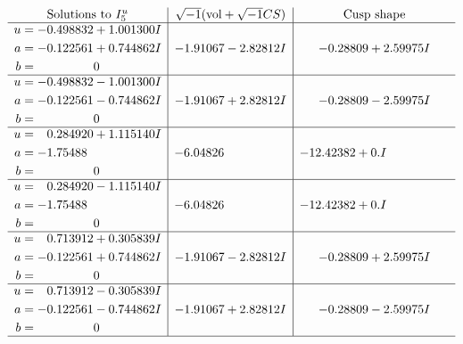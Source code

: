 \documentclass[1p]{elsarticle_modified}
\theoremstyle{definition}
\newcommand{\I}{\sqrt{-1}}
\begin{document}
$$\begin{array}{c|c|c}  
\text{Solutions to }I^u_{5}& \I (\text{vol} + \sqrt{-1}CS) & \text{Cusp shape}\\
 \hline 
\begin{aligned}
u &= -0.498832 + 1.001300 I \\
a &= -0.122561 + 0.744862 I \\
b &= \phantom{-0.000000 } 0\end{aligned}
 & -1.91067 - 2.82812 I & -0.28809 + 2.59975 I \\ \hline\begin{aligned}
u &= -0.498832 - 1.001300 I \\
a &= -0.122561 - 0.744862 I \\
b &= \phantom{-0.000000 } 0\end{aligned}
 & -1.91067 + 2.82812 I & -0.28809 - 2.59975 I \\ \hline\begin{aligned}
u &= \phantom{-}0.284920 + 1.115140 I \\
a &= -1.75488\phantom{ +0.000000I} \\
b &= \phantom{-0.000000 } 0\end{aligned}
 & -6.04826\phantom{ +0.000000I} & -12.42382 + 0. I\phantom{ +0.000000I} \\ \hline\begin{aligned}
u &= \phantom{-}0.284920 - 1.115140 I \\
a &= -1.75488\phantom{ +0.000000I} \\
b &= \phantom{-0.000000 } 0\end{aligned}
 & -6.04826\phantom{ +0.000000I} & -12.42382 + 0. I\phantom{ +0.000000I} \\ \hline\begin{aligned}
u &= \phantom{-}0.713912 + 0.305839 I \\
a &= -0.122561 + 0.744862 I \\
b &= \phantom{-0.000000 } 0\end{aligned}
 & -1.91067 - 2.82812 I & -0.28809 + 2.59975 I \\ \hline\begin{aligned}
u &= \phantom{-}0.713912 - 0.305839 I \\
a &= -0.122561 - 0.744862 I \\
b &= \phantom{-0.000000 } 0\end{aligned}
 & -1.91067 + 2.82812 I & -0.28809 - 2.59975 I\\
 \hline 
 \end{array}$$\newpage
\end{document}
